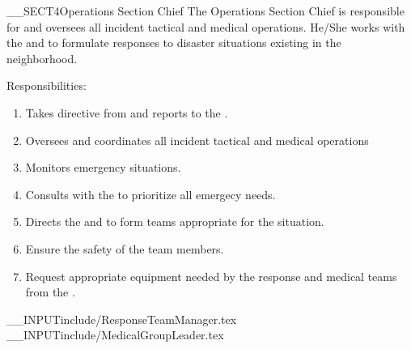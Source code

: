 __SECT4{\Large Operations Section Chief 
\label{sec:OperationsSectionChief} }
The Operations Section Chief is responsible for and oversees 
all incident tactical and medical operations.
He/She works with the \IncidentCommander and \PlanningSectionChief 
to formulate responses to disaster situations 
existing in the neighborhood.

Responsibilities:
\begin{enumerate}
\item Takes directive from and reports to the \IncidentCommander.
\item Oversees and coordinates all incident tactical and medical operations
\item Monitors emergency situations. 
\item Consults with the \IncidentCommander to prioritize all emergecy needs.
\item Directs the \ResponseTeamManager and \MedicalGroupLeader to form teams appropriate for the situation.
\item Ensure the safety of the team members.
\item Request appropriate equipment needed 
by the response and medical teams from the \LogisticsSectionChief.
\end{enumerate}

__INPUT{include/ResponseTeamManager.tex}
__INPUT{include/MedicalGroupLeader.tex}

